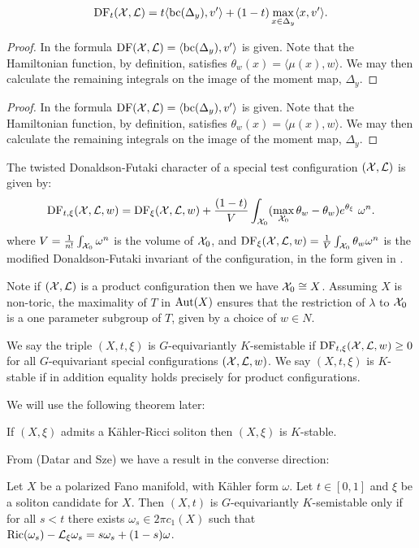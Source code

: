 \begin{proposition}
\[
\mathop{\rm DF}\nolimits_t( {\mathcal{X}}, \mathcal{L} )  = t \langle \mathop{\rm bc}\nolimits(\Delta_y), v' \rangle + (1-t) \max_{x \in \Delta_y} \langle x, v' \rangle.
\]
\end{proposition}
\begin{proof}
In \cite{ilten2015} the formula \(\mathop{\rm DF}\nolimits({\mathcal{X}},\mathcal{L}) = \langle \mathop{\rm bc}\nolimits(\Delta_y),v'\rangle\) is given. Note that the Hamiltonian function, by definition, satisfies \(\theta_w(x) = \langle \mu(x),w \rangle\). We may then calculate the remaining integrals on the image of the moment map, \(\Delta_y\).
\end{proof}
\begin{proof}
In \cite{ilten2015} the formula \(\mathop{\rm DF}\nolimits({\mathcal{X}},\mathcal{L}) = \langle \mathop{\rm bc}\nolimits(\Delta_y),v'\rangle\) is given. Note that the Hamiltonian function, by definition, satisfies \(\theta_w(x) = \langle \mu(x),w \rangle\). We may then calculate the remaining integrals on the image of the moment map, \(\Delta_y\).
\end{proof}
\begin{definition}
The twisted Donaldson-Futaki character of a special test configuration \(({\mathcal{X}}, \mathcal{L}) \) is given by:
\[
\mathop{\rm DF}\nolimits_{t,\xi}({\mathcal{X}},\mathcal{L},w) = \mathop{\rm DF}\nolimits_{\xi}({\mathcal{X}},\mathcal{L},w) + \frac{(1-t)}{V} \int_{{\mathcal{X}}_0} ( \max_{{\mathcal{X}}_0} \theta_w - \theta_w)e^{\theta_\xi} \ \omega^n . 
\]
where \(V = \frac{1}{n!} \int_{{\mathcal{X}}_0} \omega^n\) is the volume of \({\mathcal{X}}_0\), and \(\mathop{\rm DF}\nolimits_\xi({\mathcal{X}},\mathcal{L},w) = \frac{1}{V} \int_{{\mathcal{X}}_0} \theta_w \omega^n\) is the modified Donaldson-Futaki invariant of the configuration, in the form given in \cite[Lemma 3.4]{berman2014complex}.
\end{definition}
Note if \(({\mathcal{X}},\mathcal{L})\) is a product configuration then we have \({\mathcal{X}}_0 \cong X\). Assuming \(X\) is non-toric, the maximality of \(T\) in \(\mathop{\rm Aut}\nolimits(X)\) ensures that the restriction of \(\lambda\) to \({\mathcal{X}}_0\) is a one parameter subgroup of \(T\), given by a choice of \(w \in N\).
\begin{definition}
We say the triple  \((X,t,\xi)\) is \(G\)-equivariantly \(K\)-semistable if \( \mathop{\rm DF}\nolimits_{t,\xi}({\mathcal{X}},\mathcal{L},w) \ge 0\) for all \(G\)-equivariant special configurations \(({\mathcal{X}},\mathcal{L},w)\). We say \((X,t,\xi)\) is \(K\)-stable if in addition equality holds precisely for product configurations. 
\end{definition}
We will use the following theorem later:
\begin{theorem} \label{thm:BWN}
If \((X,\xi)\) admits a K\"ahler-Ricci soliton then \((X,\xi)\) is \(K\)-stable.
\end{theorem}
From (Datar and Sze) we have a result in the converse direction:
\begin{theorem} \label{thm:DS}
Let \(X\) be a polarized Fano manifold, with K\"ahler form \(\omega\). Let \(t \in [0,1]\) and \(\xi\) be a soliton candidate for \(X\). Then \((X,t)\) is \(G\)-equivariantly \(K\)-semistable only if for all \(s <t\)  there exists \(\omega_s \in 2 \pi c_1(X)\) such that \(\mathop{\rm Ric}\nolimits(\omega_s) - \mathcal{L}_\xi \omega_s = s \omega_s + (1-s) \omega\).
\end{theorem}
